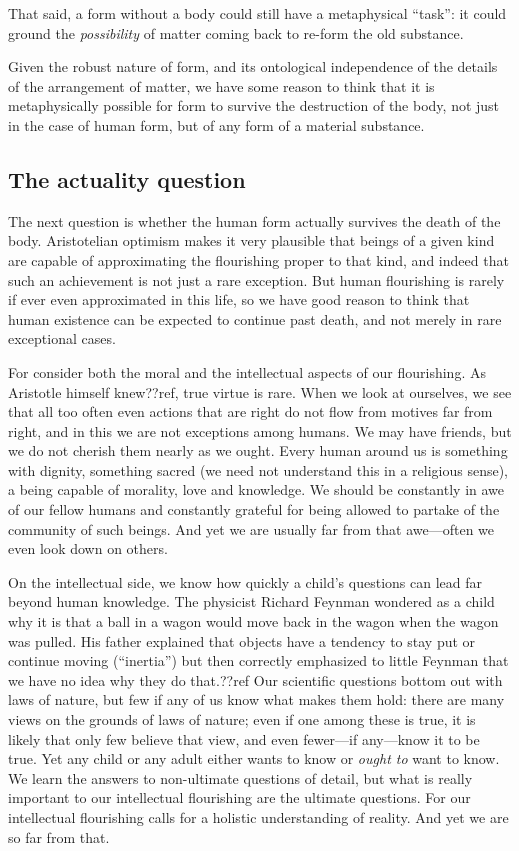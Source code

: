 That said, a form without a body could still have a metaphysical ``task'': it could ground the \textit{possibility} of matter coming back
to re-form the old substance. 

Given the robust nature of form, and its ontological independence of the details of the arrangement of matter, we have some 
reason to think that it is metaphysically possible for form to survive the destruction of the body, not just in the case of 
human form, but of any form of a material substance.

\subsection{The actuality question}
The next question is whether the human form actually survives the death of the body. Aristotelian optimism makes it very 
plausible that beings of a given kind are capable of approximating the flourishing proper to that kind, and indeed that such 
an achievement is not just a rare exception. But human flourishing is rarely if ever even approximated in this life, so we have 
good reason to think that human existence can be expected to continue past death, and not merely in rare exceptional cases. 

For consider both the moral and the intellectual aspects of our flourishing. As Aristotle himself knew??ref, true virtue is 
rare. When we look at ourselves, we see that all too often even actions that are right do not flow from motives far from 
right, and in this we are not exceptions among humans. We may have friends, but we do not cherish them nearly as we ought. 
Every human around us is something with dignity, something sacred (we need not understand this in a religious sense), a being capable of morality, love and knowledge. We should be constantly in awe of our fellow humans and constantly grateful for being allowed 
to partake of the community of such beings. And yet we are usually far from that awe---often we even look down on others. 

On the intellectual side, we know how quickly a child's questions can lead far beyond human knowledge. The physicist 
Richard Feynman wondered as a child why it is that a ball in a wagon would move back in the wagon when the wagon was 
pulled. His father explained that objects have a tendency to stay put or continue moving (``inertia'') but then correctly
emphasized to little Feynman that we have no idea why they do that.??ref Our scientific questions bottom out with laws of nature,
but few if any of us know what makes them hold: there are many views on the grounds of laws of nature; even if one among these is 
true, it is likely that only few believe that view, and even fewer---if any---know it to be true. Yet any child or any adult 
either wants to know or \textit{ought to} want to know. We learn the answers to non-ultimate questions of detail, but what is 
really important to our intellectual flourishing are the ultimate questions. For our intellectual flourishing calls for a holistic
understanding of reality. And yet we are so far from that.

